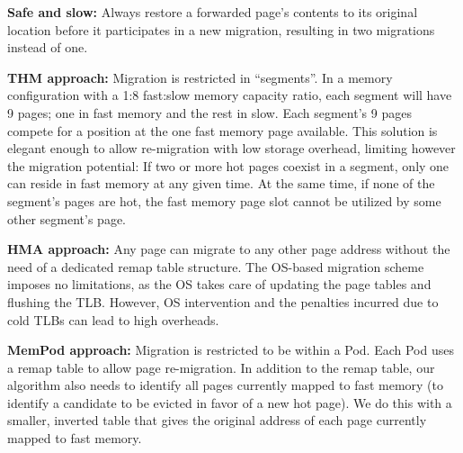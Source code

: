{	\textbf{Safe and slow:} Always restore a forwarded page's contents to its original location before it participates in a new migration, resulting in two migrations instead of one. %
}

	\textbf{THM approach:} Migration is restricted in ``segments''. In a memory configuration with a 1:8 fast:slow memory capacity ratio, each segment will have 9 pages; one in fast memory and the rest in slow. Each segment's 9 pages compete for a position at the one fast memory page available. This solution is elegant enough to allow re-migration with low storage overhead, limiting however the migration potential: If two or more hot pages coexist in a segment, only one can reside in fast memory at any given time. At the same time, if none of the segment's pages are hot, the fast memory page slot cannot be utilized by some other segment's page. %

	\textbf{HMA approach:} Any page can migrate to any other page address without the need of a dedicated remap table structure. The OS-based migration scheme imposes no limitations, as the OS takes care of updating the page tables and flushing the TLB. However, OS intervention and the penalties incurred due to cold TLBs can lead to high overheads.
	
	\textbf{MemPod approach:} Migration is restricted to be within a Pod.
Each Pod uses a remap table to allow page re-migration.  In addition to the
remap table, our algorithm also needs to identify all pages currently 
mapped to fast memory (to identify a candidate to be evicted in favor of a
new hot page).  We do this with a smaller, inverted table that gives the 
original address of each page currently mapped to fast memory.
 
